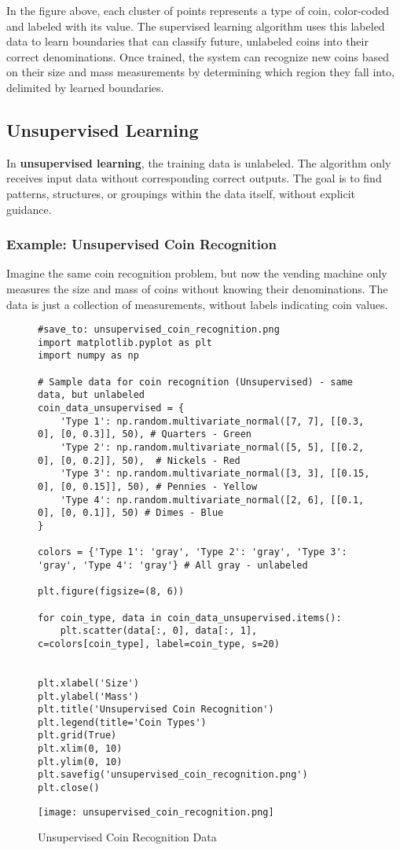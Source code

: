 \documentclass{article}
\begin{document}
In the figure above, each cluster of points represents a type of coin, color-coded and labeled with its value.  The supervised learning algorithm uses this labeled data to learn boundaries that can classify future, unlabeled coins into their correct denominations.  Once trained, the system can recognize new coins based on their size and mass measurements by determining which region they fall into, delimited by learned boundaries.


\subsection{Unsupervised Learning}
In \textbf{unsupervised learning}, the training data is unlabeled.  The algorithm only receives input data without corresponding correct outputs.  The goal is to find patterns, structures, or groupings within the data itself, without explicit guidance.

\subsubsection{Example: Unsupervised Coin Recognition}
Imagine the same coin recognition problem, but now the vending machine only measures the size and mass of coins without knowing their denominations. The data is just a collection of measurements, without labels indicating coin values.

\begin{figure}[H]
    \centering
    \begin{verbatim}
#save_to: unsupervised_coin_recognition.png
import matplotlib.pyplot as plt
import numpy as np

# Sample data for coin recognition (Unsupervised) - same data, but unlabeled
coin_data_unsupervised = {
    'Type 1': np.random.multivariate_normal([7, 7], [[0.3, 0], [0, 0.3]], 50), # Quarters - Green
    'Type 2': np.random.multivariate_normal([5, 5], [[0.2, 0], [0, 0.2]], 50),  # Nickels - Red
    'Type 3': np.random.multivariate_normal([3, 3], [[0.15, 0], [0, 0.15]], 50), # Pennies - Yellow
    'Type 4': np.random.multivariate_normal([2, 6], [[0.1, 0], [0, 0.1]], 50) # Dimes - Blue
}

colors = {'Type 1': 'gray', 'Type 2': 'gray', 'Type 3': 'gray', 'Type 4': 'gray'} # All gray - unlabeled

plt.figure(figsize=(8, 6))

for coin_type, data in coin_data_unsupervised.items():
    plt.scatter(data[:, 0], data[:, 1], c=colors[coin_type], label=coin_type, s=20)


plt.xlabel('Size')
plt.ylabel('Mass')
plt.title('Unsupervised Coin Recognition')
plt.legend(title='Coin Types')
plt.grid(True)
plt.xlim(0, 10)
plt.ylim(0, 10)
plt.savefig('unsupervised_coin_recognition.png')
plt.close()

    \end{verbatim}
    \texttt{[image: unsupervised\_coin\_recognition.png]}
    \caption{Unsupervised Coin Recognition Data}
    \label{fig:unsupervised_coin_recognition}
\end{figure}
\end{document}
